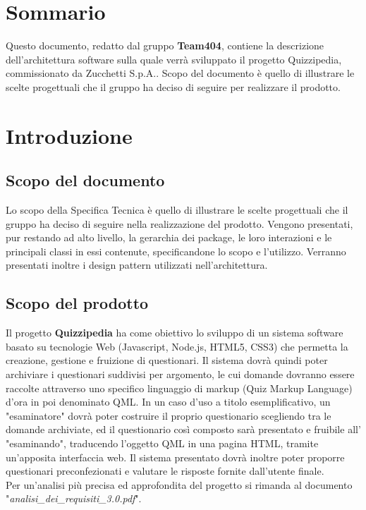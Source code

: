\documentclass[a4paper,11pt]{article}
\begin{document}
	\newpage
	\fancyhead[R]{\leftmark}
	\tableofcontents
	\newpage
	\listoffigures
	\listoftables
	
	\newpage
	
	\section*{Sommario}
	Questo documento, redatto dal gruppo \textbf{Team404}, contiene la descrizione dell'architettura software sulla quale verrà sviluppato il progetto Quizzipedia, commissionato da Zucchetti S.p.A..
Scopo del documento è quello di illustrare le scelte progettuali che il gruppo ha deciso di
seguire per realizzare il prodotto.
	
	\newpage
	\section{Introduzione}
	\subsection{Scopo del documento}
	Lo scopo della Specifica Tecnica è quello di illustrare le scelte progettuali che il gruppo ha deciso di seguire nella realizzazione del prodotto. Vengono presentati, pur restando ad alto
livello, la gerarchia dei package, le loro interazioni e le principali classi in essi contenute, specificandone lo scopo e l'utilizzo. Verranno presentati inoltre i design pattern utilizzati nell'architettura.
	
	\subsection{Scopo del prodotto}
	Il progetto \textbf{Quizzipedia} ha come obiettivo lo sviluppo di un sistema software basato su tecnologie Web (Javascript\addglos, Node.js\addglos, HTML5\addglos, CSS3\addglos) che permetta la creazione, gestione e fruizione di questionari. Il sistema dovrà quindi poter archiviare i questionari suddivisi per argomento, le cui domande dovranno essere raccolte attraverso uno specifico linguaggio di markup (Quiz Markup Language) d'ora in poi denominato QML\addglos. In un caso d'uso a titolo esemplificativo, un "esaminatore" dovrà poter costruire il proprio questionario scegliendo tra le domande archiviate, ed il questionario così composto sarà presentato e fruibile all' "esaminando", traducendo l'oggetto QML in una pagina HTML\addglos, tramite un'apposita interfaccia web. Il sistema presentato dovrà inoltre poter proporre questionari preconfezionati e valutare le risposte fornite dall'utente finale.
	\\
	Per un'analisi più precisa ed approfondita del progetto si rimanda al documento\\ "\textit{analisi\_dei\_requisiti\_3.0.pdf}".
\end{document}
